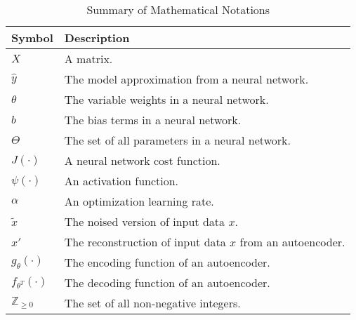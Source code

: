 \begin{table}[ht]
\caption{Summary of Mathematical Notations} %
\centering %
\begin{tabular}{l l} %
\hline %
Symbol & Description \\ %
\hline %
$X$ & A matrix. \\ %
$\hat{y}$ & The model approximation from a neural network.  \\
$\theta$ & The variable weights in a neural network.  \\
$b$ & The bias terms in a neural network. \\  %
$\Theta$ & The set of all parameters in a neural network.  \\
$J(\cdot)$ & A neural network cost function. \\
$\psi(\cdot)$ & An activation function. \\
$\alpha$ & An optimization learning rate. \\
$\tilde{x}$ & The noised version of input data $x$.  \\
$x'$ & The reconstruction of input data $x$ from an autoencoder.  \\
$g_{\theta}(\cdot)$ & The encoding function of an autoencoder.  \\
$f_{\theta^{T}}(\cdot)$ & The decoding function of an autoencoder. \\ 
$\mathbb{Z}_{\geq 0}$ & The set of all non-negative integers. \\ [1ex]
\hline %
\end{tabular}
\label{table:notation}
\end{table}

\label{lastoffront}
\clearpage
